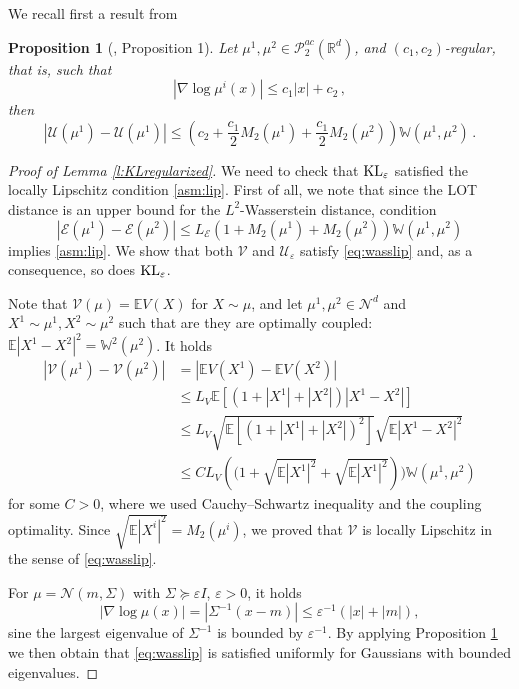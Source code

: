 \documentclass{article}
\theoremstyle{plain}
\newtheorem{proposition}[theorem]{Proposition}
\theoremstyle{definition}
\theoremstyle{remark}
\newcommand{\Rd}{ {\mathbb{R}^d}}
\newcommand{\E}{\mathcal{E}}
\newcommand{\ve}{\varepsilon}
\newcommand{\W}{\mathbb{W}}
\newcommand{\KL}{\textup{KL}}
\begin{document}
We recall first a result from \cite{polyanskiy2016wasserstein}

\begin{proposition}[{\cite{polyanskiy2016wasserstein}, Proposition 1}] \label{p:polyan}
Let $\mu^1, \mu^2 \in \mathcal{P}_2^{ac}(\Rd)$, and $(c_1,c_2)$-regular, that is, such that
\[
| \nabla \log \mu^i(x)| \leq c_1 |x| + c_2\,,
\]
then 
\begin{equation}
|\mathcal{U}(\mu^1) - \mathcal{U}(\mu^1)| \leq \left (c_2 + \frac{c_1}2M_2(\mu^1) + \frac{c_1}2M_2(\mu^2)\right ) \W(\mu^1, \mu^2)\,.
\end{equation}
\end{proposition}


\begin{proof}[Proof of Lemma \ref{l:KLregularized}] 
We need to check that $\KL_\ve$ satisfied the locally Lipschitz condition \eqref{asm:lip}.  First of all, we note that since the LOT distance is an upper bound for the $L^2$-Wasserstein distance, condition 
\begin{equation} \label{eq:wasslip}
|\E(\mu^1) - \E(\mu^2)| \leq L_\E \left(1 + M_2(\mu^1) + M_2(\mu^2)\right)  \W(\mu^1, \mu^2)
\end{equation}
implies \eqref{asm:lip}. We show that both $\mathcal{V}$ and $\mathcal{U}_\ve$ satisfy  \eqref{eq:wasslip} and, as a consequence, so does $\KL_\ve$.

Note that $\mathcal{V}(\mu) = \mathbb{E}V(X)$ for $X\sim \mu$, and let $\mu^1, \mu^2\in \mathcal{N}^d$ and $X^1\sim \mu^1, X^2\sim\mu^2$ such that are they are optimally coupled: $\mathbb{E}|X^1 - X^2|^2 = \W^2(\mu^2)$. It holds
\begin{align*}
|\mathcal{V}(\mu^1) - \mathcal{V}(\mu^2)|
 &= |\mathbb{E}V(X^1) - \mathbb{E}V(X^2)| \\
 & \leq L_V\mathbb{E}\left[(1 + |X^1| + |X^2|)|X^1 - X^2|\right] \\
 & \leq L_V \sqrt{\mathbb{E}\left[ (1 + |X^1| + |X^2|)^2 \right]}
 \sqrt{\mathbb{E}|X^1 - X^2|^2} \\
 & \leq C L_V \left((1 + \sqrt{\mathbb{E}|X^1|^2} + \sqrt{\mathbb{E}|X^1|^2}\right)) \W(\mu^1, \mu^2)
\end{align*}
for some $C>0$, where we used Cauchy--Schwartz inequality and the coupling optimality. Since $\sqrt{\mathbb{E}|X^i|^2} = M_2(\mu^i)$, we proved that $\mathcal{V}$ is locally Lipschitz in the sense of \eqref{eq:wasslip}.


For $\mu = \mathcal{N}(m, \Sigma)$ with $\Sigma \succcurlyeq \ve I$, $\ve>0$, it holds
\[
|\nabla \log \mu(x)| = |\Sigma^{-1}(x - m)| \leq \ve^{-1} (|x| + |m|),
\]
sine the largest eigenvalue of $\Sigma^{-1}$ is bounded by $\ve^{-1}$. By applying Proposition \ref{p:polyan} we then obtain that \eqref{eq:wasslip} is satisfied uniformly for Gaussians with bounded eigenvalues.
\end{proof}
\end{document}
